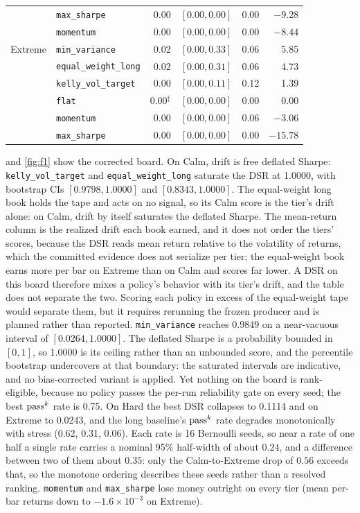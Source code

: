 \begin{table}[t]
\begin{tabular}{@{}ll r c r r@{}}
 & \texttt{max\_sharpe} & 0.00 & $[0.00, 0.00]$ & 0.00 & $-9.28$ \\
 & \texttt{momentum} & 0.00 & $[0.00, 0.00]$ & 0.00 & $-8.44$ \\
\addlinespace
Extreme & \texttt{min\_variance} & 0.02 & $[0.00, 0.33]$ & 0.06 & 5.85 \\
 & \texttt{equal\_weight\_long} & 0.02 & $[0.00, 0.31]$ & 0.06 & 4.73 \\
 & \texttt{kelly\_vol\_target} & 0.00 & $[0.00, 0.11]$ & 0.12 & 1.39 \\
 & \texttt{flat} & 0.00$^{\ddagger}$ & $[0.00, 0.00]$ & 0.00 & 0.00 \\
 & \texttt{momentum} & 0.00 & $[0.00, 0.00]$ & 0.06 & $-3.06$ \\
 & \texttt{max\_sharpe} & 0.00 & $[0.00, 0.00]$ & 0.00 & $-15.78$ \\
\bottomrule
\end{tabular}
\end{table}

 and \cref{fig:f1} show the corrected board. On Calm, drift is free deflated Sharpe: \texttt{kelly\_vol\_target} and \texttt{equal\_weight\_long} saturate the DSR at 1.0000, with bootstrap CIs $[0.9798, 1.0000]$ and $[0.8343, 1.0000]$. The equal-weight long book holds the tape and acts on no signal, so its Calm score is the tier's drift alone: on Calm, drift by itself saturates the deflated Sharpe. The mean-return column is the realized drift each book earned, and it does not order the tiers' scores, because the DSR reads mean return relative to the volatility of returns, which the committed evidence does not serialize per tier; the equal-weight book earns more per bar on Extreme than on Calm and scores far lower. A DSR on this board therefore mixes a policy's behavior with its tier's drift, and the table does not separate the two. Scoring each policy in excess of the equal-weight tape would separate them, but it requires rerunning the frozen producer and is planned rather than reported. \texttt{min\_variance} reaches 0.9849 on a near-vacuous interval of $[0.0264, 1.0000]$. The deflated Sharpe is a probability bounded in $[0,1]$, so 1.0000 is its ceiling rather than an unbounded score, and the percentile bootstrap undercovers at that boundary: the saturated intervals are indicative, and no bias-corrected variant is applied. Yet nothing on the board is rank-eligible, because no policy passes the per-run reliability gate on every seed; the best $\text{pass}^{k}$ rate is 0.75. On Hard the best DSR collapses to 0.1114 and on Extreme to 0.0243, and the long baseline's $\text{pass}^{k}$ rate degrades monotonically with stress (0.62, 0.31, 0.06). Each rate is 16 Bernoulli seeds, so near a rate of one half a single rate carries a nominal 95\% half-width of about $0.24$, and a difference between two of them about $0.35$: only the Calm-to-Extreme drop of $0.56$ exceeds that, so the monotone ordering describes these seeds rather than a resolved ranking. \texttt{momentum} and \texttt{max\_sharpe} lose money outright on every tier (mean per-bar returns down to $-1.6 \times 10^{-3}$ on Extreme).

